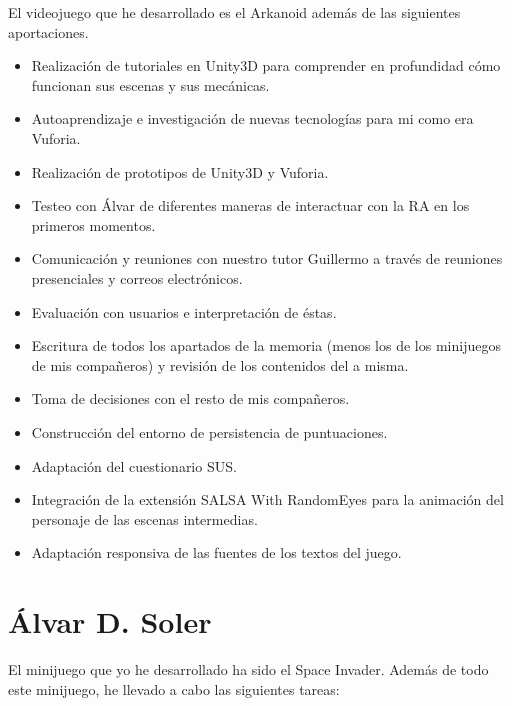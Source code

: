 El videojuego que he desarrollado es el Arkanoid además de las siguientes aportaciones.

\begin{itemize}
\item{Realización de tutoriales en Unity3D para comprender en profundidad cómo funcionan sus escenas y sus mecánicas.}
\item{Autoaprendizaje e investigación de nuevas tecnologías para mi como era Vuforia.}
\item{Realización de prototipos de Unity3D y Vuforia.}
\item{Testeo con Álvar de diferentes maneras de interactuar con la RA en los primeros momentos.}
\item{Comunicación y reuniones con nuestro tutor Guillermo a través de reuniones presenciales y correos electrónicos.}
\item{Evaluación con usuarios e interpretación de éstas.}
\item{Escritura de todos los apartados de la memoria (menos los de los minijuegos de mis compañeros) y revisión de los contenidos del a misma.}
\item{Toma de decisiones con el resto de mis compañeros.}
\item{Construcción del entorno de persistencia de puntuaciones.}
\item{Adaptación del cuestionario SUS.}
\item{Integración de la extensión SALSA With RandomEyes para la animación del personaje de las escenas intermedias.}
\item{Adaptación responsiva de las fuentes de los textos del juego.}
\end{itemize}

\section{Álvar D. Soler}
\label{cap10:sec:alvar}

El minijuego que yo he desarrollado ha sido el Space Invader. Además de todo este minijuego, he llevado a cabo las siguientes tareas:

